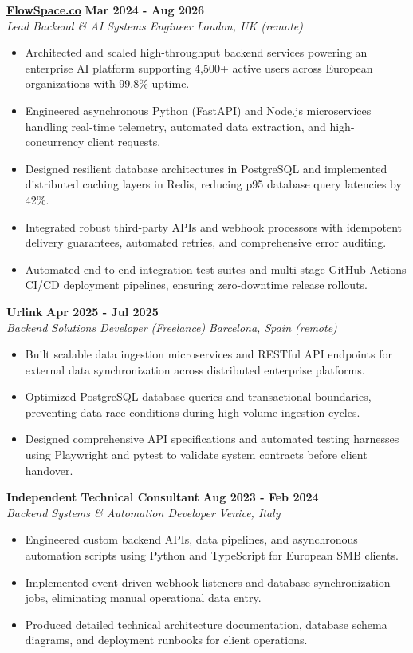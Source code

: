 \documentclass[10pt,a4paper]{article}
\newcommand{\role}[4]{%
  \textbf{#1} \hfill \textbf{#2}\\[1pt]%
  \textit{#3} \hfill \textit{#4}\\[2pt]%
}
\begin{document}
\role{\href{https://flowspace.co}{FlowSpace.co}}{Mar 2024 - Aug 2026}{Lead Backend \& AI Systems Engineer}{London, UK (remote)}
\begin{itemize}
  \item Architected and scaled high-throughput backend services powering an enterprise AI platform supporting 4,500+ active users across European organizations with 99.8\% uptime.
  \item Engineered asynchronous Python (FastAPI) and Node.js microservices handling real-time telemetry, automated data extraction, and high-concurrency client requests.
  \item Designed resilient database architectures in PostgreSQL and implemented distributed caching layers in Redis, reducing p95 database query latencies by 42\%.
  \item Integrated robust third-party APIs and webhook processors with idempotent delivery guarantees, automated retries, and comprehensive error auditing.
  \item Automated end-to-end integration test suites and multi-stage GitHub Actions CI/CD deployment pipelines, ensuring zero-downtime release rollouts.
\end{itemize}

\role{Urlink}{Apr 2025 - Jul 2025}{Backend Solutions Developer (Freelance)}{Barcelona, Spain (remote)}
\begin{itemize}
  \item Built scalable data ingestion microservices and RESTful API endpoints for external data synchronization across distributed enterprise platforms.
  \item Optimized PostgreSQL database queries and transactional boundaries, preventing data race conditions during high-volume ingestion cycles.
  \item Designed comprehensive API specifications and automated testing harnesses using Playwright and pytest to validate system contracts before client handover.
\end{itemize}

\role{Independent Technical Consultant}{Aug 2023 - Feb 2024}{Backend Systems \& Automation Developer}{Venice, Italy}
\begin{itemize}
  \item Engineered custom backend APIs, data pipelines, and asynchronous automation scripts using Python and TypeScript for European SMB clients.
  \item Implemented event-driven webhook listeners and database synchronization jobs, eliminating manual operational data entry.
  \item Produced detailed technical architecture documentation, database schema diagrams, and deployment runbooks for client operations.
\end{itemize}
\end{document}
